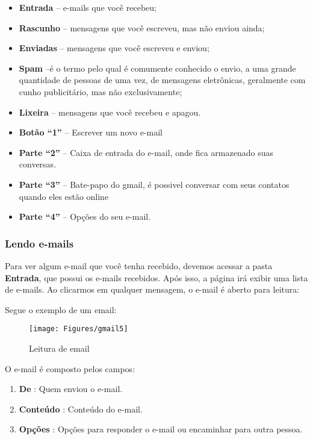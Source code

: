 \documentclass[hidelinks,12pt]{article}
\begin{document}
	\begin{itemize}
		\item \textbf{Entrada} – e-mails que você recebeu;

		\item \textbf{Rascunho} – mensagens que você escreveu, mas não enviou ainda;

		\item \textbf{Enviadas} – mensagens que você escreveu e enviou;

		\item \textbf{Spam} –é o termo pelo qual é comumente conhecido o envio, a uma grande quantidade de pessoas de uma vez, de mensagens eletrônicas, geralmente com cunho publicitário, mas não exclusivamente;

		\item \textbf{Lixeira} – mensagens que você recebeu e apagou.

		\item \textbf{Botão “1”} – Escrever um novo e-mail

		\item \textbf{Parte “2”} – Caixa de entrada do e-mail, onde fica armazenado suas conversas.

		\item \textbf{Parte “3”} – Bate-papo do gmail, é possivel conversar com seus contatos quando eles estão online

		\item \textbf{Parte “4”} – Opções do seu e-mail.

	\end{itemize}


	\subsubsection{Lendo e-mails}

	Para ver algum e-mail que você tenha recebido, devemos acessar a pasta \textbf{Entrada}, que possui os e-mails recebidos. Após isso, a página irá exibir uma lista de e-mails. Ao clicarmos em qualquer mensagem, o e-mail é aberto para leitura:

	Segue o exemplo de um email:

	\begin{figure}[!h]
		\centering
		\texttt{[image: Figures/gmail5]}
		\label{fig:gmail5}
		\caption{Leitura de email}
	\end{figure}

	O e-mail é composto pelos campos:

	\begin{enumerate}
		\item \textbf{De} : Quem enviou o e-mail.

		\item \textbf{Conteúdo} : Conteúdo do e-mail.

		\item \textbf{Opções} : Opções para responder o e-mail ou encaminhar para outra pessoa.
	\end{enumerate}
\end{document}

